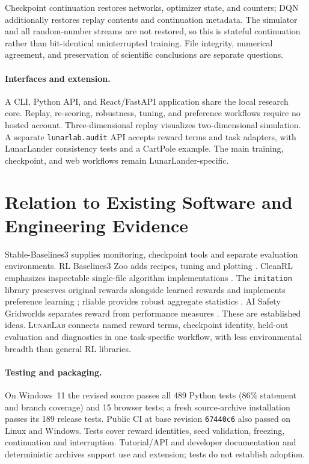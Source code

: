 \documentclass[twoside,11pt]{article}
\newcommand{\lunarlab}{\textsc{LunarLab}}
\begin{document}
Checkpoint continuation restores networks, optimizer state, and counters; DQN additionally restores replay
contents and continuation metadata. The simulator and all random-number streams are not restored, so this is
stateful continuation rather than bit-identical uninterrupted training. File integrity, numerical agreement,
and preservation of scientific conclusions are separate questions.

\paragraph{Interfaces and extension.} A CLI, Python API, and React/FastAPI application share the local research core. Replay, re-scoring, robustness,
tuning, and preference workflows require no hosted account. Three-dimensional replay visualizes two-dimensional
simulation. A separate
\texttt{lunarlab.audit} API accepts reward terms and task adapters, with LunarLander consistency tests and a
CartPole example. The main training, checkpoint, and web workflows remain LunarLander-specific.

\section{Relation to Existing Software and Engineering Evidence}
Stable-Baselines3 supplies monitoring, checkpoint tools and separate evaluation environments.
RL Baselines3 Zoo adds recipes, tuning and plotting \citep{raffin2020zoo}. CleanRL emphasizes inspectable
single-file algorithm implementations \citep{huang2022cleanrl}. The \texttt{imitation} library preserves original
rewards alongside learned rewards and implements preference learning \citep{gleave2022imitation}; rliable
provides robust aggregate statistics \citep{agarwal2021precipice}. AI Safety Gridworlds separates reward from
performance measures \citep{leike2017gridworlds}. These are established ideas. \lunarlab{} connects named reward terms, checkpoint identity, held-out evaluation
and diagnostics in one task-specific workflow, with less environmental breadth than general RL libraries.

\paragraph{Testing and packaging.} On Windows~11 the revised source passes all 489 Python tests (86\%
statement and branch coverage) and 15 browser tests; a fresh source-archive installation passes its 189 release
tests. Public CI at base revision \texttt{67440c6} also passed on Linux and Windows. Tests cover reward
identities, seed validation, freezing, continuation and interruption. Tutorial/API and developer documentation
and deterministic archives support use and extension; tests do not establish adoption.
\end{document}
